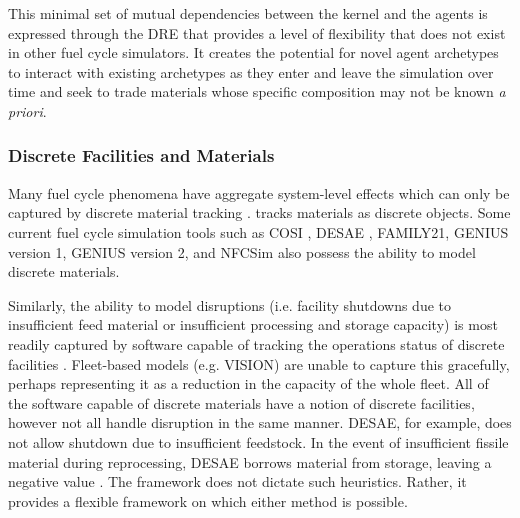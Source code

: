 This minimal set of mutual dependencies between the kernel and the agents is
expressed through the \gls{DRE} that provides a level of flexibility that does
not exist in other fuel cycle simulators.  It creates the potential for novel
agent archetypes to interact with existing archetypes as they enter and leave
the simulation over time and seek to trade materials whose specific
composition may not be known \textit{a priori}.

\subsubsection{Discrete Facilities and Materials}

Many fuel cycle phenomena have aggregate system-level effects which can only be
captured by discrete material tracking \cite{huff_next_2010}.  \Cyclus
tracks materials as discrete objects. Some current fuel cycle simulation tools
such as \gls{COSI}
\cite{mccarthy_benchmark_2012,grasso_nea-wpfc/fcts_2009,guerin_benchmark_2009},
\gls{DESAE}
\cite{andrianova_desae_2008}, FAMILY21\cite{mccarthy_benchmark_2012},
\gls{GENIUS} version 1, \gls{GENIUS} version 2, and \gls{NFCSim} also possess the ability to
model discrete materials.

Similarly, the ability to model disruptions (i.e. facility shutdowns due to
insufficient feed material or insufficient processing and storage capacity) is
most readily captured by software capable of tracking the operations status of
discrete facilities \cite{huff_next_2010}.  Fleet-based models (e.g.
\gls{VISION}) are unable to capture this gracefully, perhaps representing it as
a reduction in the capacity of the whole fleet.  All of the software
capable of discrete materials have a notion of discrete facilities, however not
all handle disruption in the same manner. \gls{DESAE}, for example, does not
allow shutdown due to insufficient feedstock. In the event
of insufficient fissile material during reprocessing, \gls{DESAE} borrows
material from storage, leaving a negative value \cite{mccarthy_benchmark_2012}.
The \Cyclus framework does not dictate such heuristics. Rather, it provides a
flexible framework on which either method is possible.
